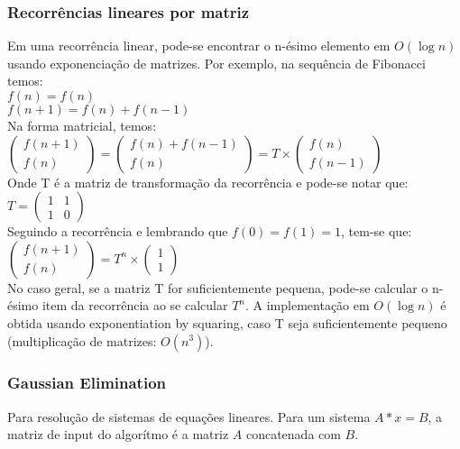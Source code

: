 \subsubsection{Recorrências lineares por matriz}
Em uma recorrência linear, pode-se encontrar o n-ésimo elemento em $O(\log{n})$ usando exponenciação de matrizes. Por exemplo, na sequência de Fibonacci temos:
\\ $f(n) = f(n)$
\\ $f(n+1) = f(n)+f(n-1)$
\\Na forma matricial, temos:
\\
$\left( \begin{array}{c}
f(n+1) \\
f(n) \end{array} \right)
 = 
\left( \begin{array}{c}
f(n) + f(n-1) \\
f(n) \end{array} \right)
 = T \times
\left( \begin{array}{c}
f(n) \\
f(n-1) \end{array} \right)$
\\ Onde T é a matriz de transformação da recorrência e pode-se notar que:
$T=\left( \begin{array}{cc}
1 & 1 \\
1 & 0 \end{array} \right)$
\\ Seguindo a recorrência e lembrando que $f(0) = f(1) = 1$, tem-se que:
\\$\left( \begin{array}{c}
f(n+1) \\
f(n) \end{array} \right) = T^n \times
\left( \begin{array}{c}
1 \\
1 \end{array} \right)$
\\ No caso geral, se a matriz T for suficientemente pequena, pode-se calcular o n-ésimo item da recorrência ao se calcular $T^n$. A implementação em $O(\log{n})$ é obtida usando exponentiation by squaring, caso T seja suficientemente pequeno (multiplica\c{c}\~{a}o de matrizes: $O(n^3)$).

\divisor
\subsubsection{Gaussian Elimination}
Para resolu\c{c}\~{a}o de sistemas de equa\c{c}\~{o}es lineares. Para um sistema $A*x = B$, a matriz de input do algor\'{i}tmo \'{e} a matriz $A$ concatenada com $B$.

\divisor
